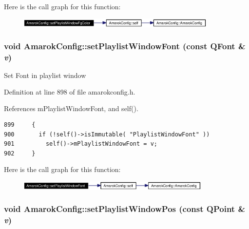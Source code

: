 Here is the call graph for this function:\begin{figure}[H]
\begin{center}
\leavevmode
\includegraphics[width=282pt]{classAmarokConfig_AmarokConfige105_cgraph}
\end{center}
\end{figure}
\subsubsection{\setlength{\rightskip}{0pt plus 5cm}void Amarok\-Config::set\-Playlist\-Window\-Font (const QFont \& {\em v})\hspace{0.3cm}{\tt  [inline, static]}}\label{classAmarokConfig_AmarokConfige93}


Set Font in playlist window 

Definition at line 898 of file amarokconfig.h.

References m\-Playlist\-Window\-Font, and self().



\footnotesize\begin{verbatim}899     {
900       if (!self()->isImmutable( "PlaylistWindowFont" ))
901         self()->mPlaylistWindowFont = v;
902     }
\end{verbatim}\normalsize 


Here is the call graph for this function:\begin{figure}[H]
\begin{center}
\leavevmode
\includegraphics[width=274pt]{classAmarokConfig_AmarokConfige93_cgraph}
\end{center}
\end{figure}
\subsubsection{\setlength{\rightskip}{0pt plus 5cm}void Amarok\-Config::set\-Playlist\-Window\-Pos (const QPoint \& {\em v})\hspace{0.3cm}{\tt  [inline, static]}}\label{classAmarokConfig_AmarokConfige5}


